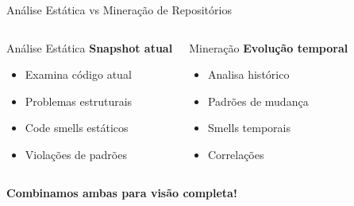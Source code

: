 \documentclass[aspectratio=169,11pt]{beamer}
\begin{document}
\begin{frame}{Análise Estática vs Mineração de Repositórios}
\begin{columns}[T]
\begin{block}{ Análise Estática}
\textbf{Snapshot atual}
\begin{itemize}
    \item Examina código atual
    \item Problemas estruturais
    \item Code smells estáticos
    \item Violações de padrões
\end{itemize}
\end{block}

\begin{block}{ Mineração}
\textbf{Evolução temporal}
\begin{itemize}
    \item Analisa histórico
    \item Padrões de mudança
    \item Smells temporais
    \item Correlações
\end{itemize}
\end{block}
\end{columns}

\begin{center}
\textbf{Combinamos ambas para visão completa!}
\end{center}
\end{frame}
\end{document}

